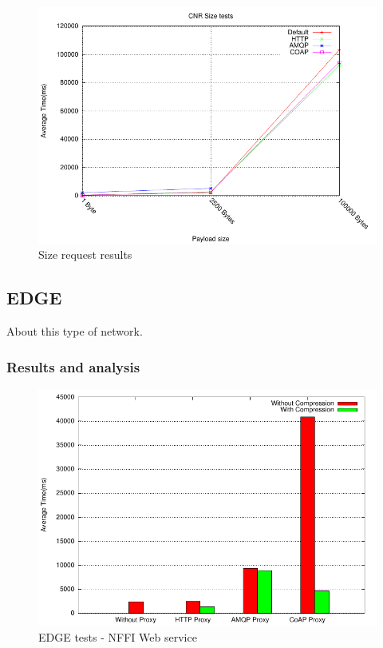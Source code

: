 \begin{figure}[H]
\center
\includegraphics[scale=0.75]{../results/cnr/size/result.pdf}
\caption{Size request results}
\end{figure}


\subsection{EDGE}

About this type of network.

\subsubsection{Results and analysis}

\begin{figure}[H]
\center
\includegraphics[scale=0.75]{../results/edge/nffi/result.pdf}
\caption{EDGE tests - NFFI Web service}
\end{figure}

